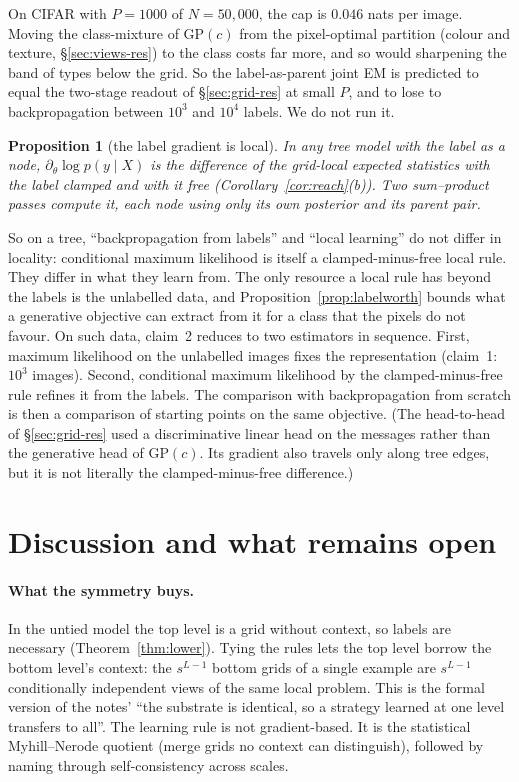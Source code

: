 \documentclass[11pt]{article}
\newtheorem{proposition}[theorem]{Proposition}
\theoremstyle{definition}
\begin{document}
\noindent On CIFAR with $P=1000$ of $N=50{,}000$, the cap is $0.046$ nats per image. Moving the class-mixture of
$\mathrm{GP}(c)$ from the pixel-optimal partition (colour and texture, \S\ref{sec:views-res}) to the class costs far more, and
so would sharpening the band of types below the grid. So the label-as-parent joint EM is predicted to equal the two-stage
readout of \S\ref{sec:grid-res} at small $P$, and to lose to backpropagation between $10^3$ and $10^4$ labels. We do not run
it.

\begin{proposition}[the label gradient is local]\label{prop:localgrad}
In any tree model with the label as a node, $\partial_\theta\log p(y\mid X)$ is the difference of the grid-local expected
statistics with the label clamped and with it free (Corollary~\ref{cor:reach}(b)). Two sum--product passes compute it, each
node using only its own posterior and its parent pair.
\end{proposition}

\noindent So on a tree, ``backpropagation from labels'' and ``local learning'' do not differ in locality: conditional
maximum likelihood is itself a clamped-minus-free local rule. They differ in what they learn from. The only resource a local
rule has beyond the labels is the unlabelled data, and Proposition~\ref{prop:labelworth} bounds what a generative objective can
extract from it for a class that the pixels do not favour. On such data, claim~2 reduces to two estimators in sequence. First,
maximum likelihood on the unlabelled images fixes the representation (claim~1: $10^3$ images). Second, conditional maximum
likelihood by the clamped-minus-free rule refines it from the labels. The comparison with backpropagation from scratch is then
a comparison of starting points on the same objective. (The head-to-head of \S\ref{sec:grid-res} used a discriminative
linear head on the messages rather than the generative head of $\mathrm{GP}(c)$. Its gradient also travels only along tree
edges, but it is not literally the clamped-minus-free difference.)

\section{Discussion and what remains open}
\paragraph{What the symmetry buys.}
In the untied model the top level is a grid without context, so labels are necessary
(Theorem~\ref{thm:lower}). Tying the rules lets the top level borrow the bottom level's context:
the $s^{L-1}$ bottom grids of a single example are $s^{L-1}$ conditionally independent views of
the same local problem. This is the formal version of the notes' ``the substrate is identical,
so a strategy learned at one level transfers to all''. The learning rule is not gradient-based.
It is the statistical Myhill--Nerode quotient (merge grids no context can distinguish), followed
by naming through self-consistency across scales.
\end{document}
